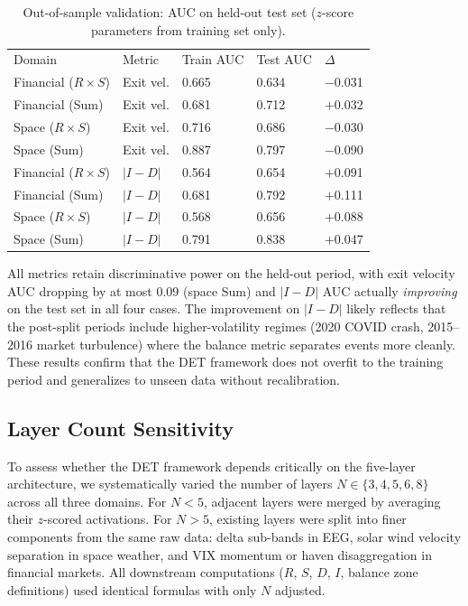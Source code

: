 \documentclass[aip,cha,reprint,amsmath,amssymb,final]{revtex4-2}
\begin{document}
\begin{table}[!htbp]
\caption[Out-of-sample validation AUC on held-out test set for financial and space weather domains]{\label{tab:oos}Out-of-sample validation: AUC on held-out test set ($z$-score parameters from training set only).}
\begin{ruledtabular}
\begin{tabular}{lllll}
Domain & Metric & Train AUC & Test AUC & $\Delta$ \\
Financial ($R \times S$) & Exit vel. & 0.665 & 0.634 & $-$0.031 \\
Financial (Sum) & Exit vel. & 0.681 & 0.712 & $+$0.032 \\
Space ($R \times S$) & Exit vel. & 0.716 & 0.686 & $-$0.030 \\
Space (Sum) & Exit vel. & 0.887 & 0.797 & $-$0.090 \\
Financial ($R \times S$) & $|I{-}D|$ & 0.564 & 0.654 & $+$0.091 \\
Financial (Sum) & $|I{-}D|$ & 0.681 & 0.792 & $+$0.111 \\
Space ($R \times S$) & $|I{-}D|$ & 0.568 & 0.656 & $+$0.088 \\
Space (Sum) & $|I{-}D|$ & 0.791 & 0.838 & $+$0.047 \\
\end{tabular}
\end{ruledtabular}
\end{table}

All metrics retain discriminative power on the held-out period, with exit velocity AUC dropping by at most 0.09 (space Sum) and $|I{-}D|$ AUC actually \emph{improving} on the test set in all four cases. The improvement on $|I{-}D|$ likely reflects that the post-split periods include higher-volatility regimes (2020 COVID crash, 2015--2016 market turbulence) where the balance metric separates events more cleanly. These results confirm that the DET framework does not overfit to the training period and generalizes to unseen data without recalibration.

\subsection{Layer Count Sensitivity}

To assess whether the DET framework depends critically on the five-layer architecture, we systematically varied the number of layers $N \in \{3, 4, 5, 6, 8\}$ across all three domains. For $N < 5$, adjacent layers were merged by averaging their $z$-scored activations. For $N > 5$, existing layers were split into finer components from the same raw data: delta sub-bands in EEG, solar wind velocity separation in space weather, and VIX momentum or haven disaggregation in financial markets. All downstream computations ($R$, $S$, $D$, $I$, balance zone definitions) used identical formulas with only $N$ adjusted.
\end{document}
